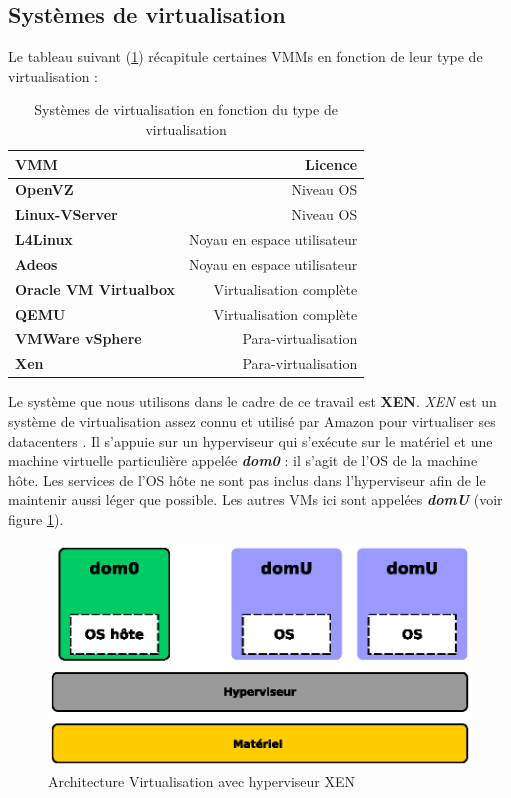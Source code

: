 \subsection{Systèmes de virtualisation}
Le tableau suivant (\ref{tab:sytemes_virtualisation}) récapitule certaines \acs{VMM}s en fonction de leur type de virtualisation :
\begin{table}[H]
  \begin{center}
    \caption{Systèmes de virtualisation en fonction du type de virtualisation}
    \begin{tabular}{>{\bfseries}l r}
      \hline
      \textbf{VMM} & \textbf{Licence} \\
      \hline
      OpenVZ & Niveau OS \\ 
      Linux-VServer & Niveau OS \\ 
      L4Linux & Noyau en espace utilisateur \\ 
      Adeos & Noyau en espace utilisateur \\ 
      Oracle VM Virtualbox & Virtualisation complète \\
      QEMU & Virtualisation complète \\ 
      VMWare vSphere & Para-virtualisation \\ 
      Xen & Para-virtualisation \\   \hline
    \end{tabular}
    \label{tab:sytemes_virtualisation}
  \end{center}
\end{table}

\noindent Le système que nous utilisons dans le cadre de ce travail est \textbf{XEN}. \emph{XEN} est un système de virtualisation assez connu \cite{article2} et utilisé par Amazon pour virtualiser ses datacenters \cite{online4}. Il s'appuie sur un hyperviseur qui s'exécute sur le matériel et une machine virtuelle particulière appelée \textit{\textbf{dom0}} : il s'agit de l'OS de la machine hôte. Les services de l'OS hôte ne sont pas inclus dans l'hyperviseur afin de le maintenir aussi léger que possible. Les autres VMs ici sont appelées \textit{\textbf{domU}} (voir figure \ref{fig:virtualisation_xen}).\\

\begin{figure}[H]
      \centering
      \includegraphics[scale=.7]{fig1/virtualisation_xen}
      \caption{Architecture Virtualisation avec hyperviseur XEN}
      \label{fig:virtualisation_xen}
\end{figure}

